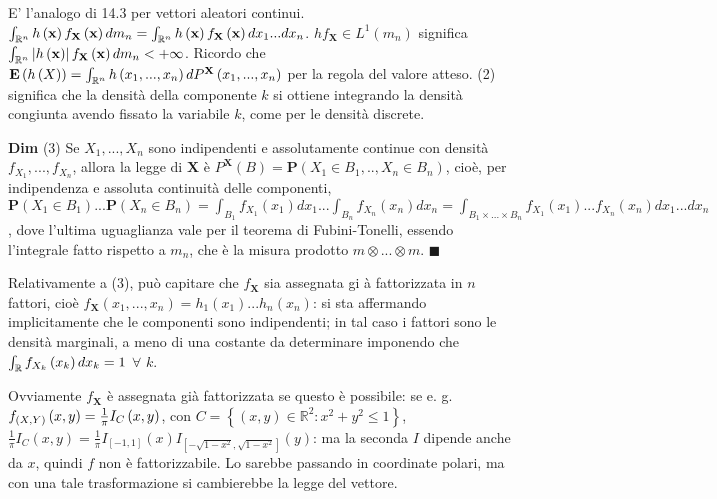 \documentclass{article}
\begin{document}
E' l'analogo di 14.3 per vettori aleatori continui. $\int_{%
\mathbb{R}
^{n}}h\left( \mathbf{x}\right) f_{\mathbf{X}}\left( \mathbf{x}\right)
dm_{n}=\int_{%
\mathbb{R}
^{n}}h\left( \mathbf{x}\right) f_{\mathbf{X}}\left( \mathbf{x}\right)
dx_{1}...dx_{n}$. $hf_{\mathbf{X}}\in L^{1}\left( m_{n}\right) $ significa $%
\int_{%
\mathbb{R}
^{n}}\left\vert h\left( \mathbf{x}\right) \right\vert f_{\mathbf{X}}\left( 
\mathbf{x}\right) dm_{n}<+\infty $. Ricordo che $\mathbf{E}\left( h\left(
X\right) \right) =\int_{%
\mathbb{R}
^{n}}h\left( x_{1},...,x_{n}\right) dP^{\mathbf{X}}\left(
x_{1},...,x_{n}\right) $ per la regola del valore atteso. (2) significa
che la densit\`{a} della componente $k$ si ottiene integrando la densit\`{a}
congiunta avendo fissato la variabile $k$, come per le densit\`{a} discrete.

\textbf{Dim} (3) Se $X_{1},...,X_{n}$ sono indipendenti e assolutamente
continue con densit\`{a} $f_{X_{1}},...,f_{X_{n}}$, allora la legge di $%
\mathbf{X}$ \`{e} $P^{\mathbf{X}}\left( B\right) =\mathbf{P}\left( X_{1}\in
B_{1},..,X_{n}\in B_{n}\right) $, cio\`{e}, per indipendenza e assoluta
continuit\`{a} delle componenti, $\mathbf{P}\left( X_{1}\in B_{1}\right) ...%
\mathbf{P}\left( X_{n}\in B_{n}\right) =\int_{B_{1}}f_{X_{1}}\left(
x_{1}\right) dx_{1}...\int_{B_{n}}f_{X_{n}}\left( x_{n}\right)
dx_{n}=\int_{B_{1}\times ...\times B_{n}}f_{X_{1}}\left( x_{1}\right)
...f_{X_{n}}\left( x_{n}\right) dx_{1}...dx_{n}$, dove l'ultima uguaglianza
vale per il teorema di Fubini-Tonelli, essendo l'integrale fatto rispetto a $%
m_{n}$, che \`{e} la misura prodotto $m\otimes ...\otimes m$.
$\blacksquare $

Relativamente a (3), pu\`{o} capitare che $f_{\mathbf{X}}$ sia assegnata gi%
\`{a} fattorizzata in $n$ fattori, cio\`{e} $f_{\mathbf{X}}\left(
x_{1},...,x_{n}\right) =h_{1}\left( x_{1}\right) ...h_{n}\left( x_{n}\right) 
$: si sta affermando implicitamente che le componenti sono indipendenti; in
tal caso i fattori sono le densit\`{a} marginali, a meno di una costante da
determinare imponendo che $\int_{%
\mathbb{R}
}f_{X_{k}}\left( x_{k}\right) dx_{k}=1$ $\forall $ $k$.

Ovviamente $f_{\mathbf{X}}$ \`{e} assegnata gi\`{a} fattorizzata se questo 
\`{e} possibile: se e. g. $f_{\left( X,Y\right) }\left( x,y\right) =\frac{1}{%
\pi }I_{C}\left( x,y\right) $, con $C=\left\{ \left( x,y\right) \in 
\mathbb{R}
^{2}:x^{2}+y^{2}\leq 1\right\} $, $\frac{1}{\pi }I_{C}\left( x,y\right) =%
\frac{1}{\pi }I_{\left[ -1,1\right] }\left( x\right) I_{\left[ -\sqrt{1-x^{2}%
},\sqrt{1-x^{2}}\right] }\left( y\right) $: ma la seconda $I$ dipende anche
da $x$, quindi $f$ non \`{e} fattorizzabile. Lo sarebbe passando in
coordinate polari, ma con una tale trasformazione si cambierebbe la legge
del vettore.
\end{document}
